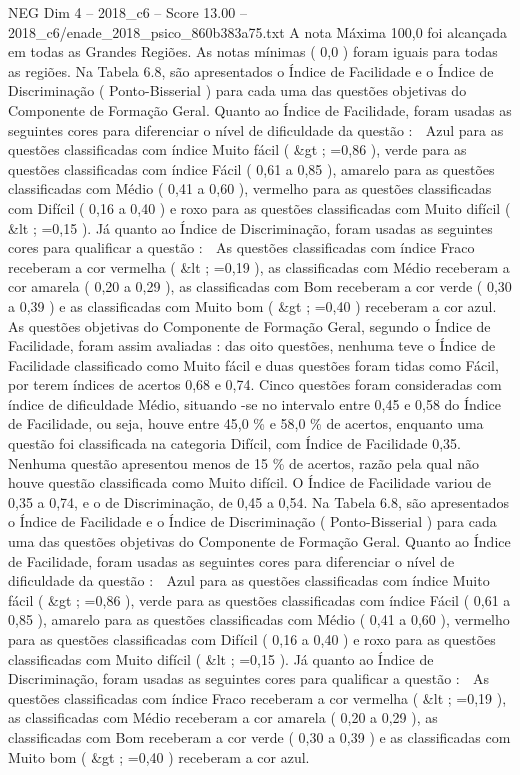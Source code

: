 \begin{textsample}{NEG Dim 4 – 2018\_c6 – Score 13.00 – 2018\_c6/enade\_2018\_psico\_860b383a75.txt}
A nota Máxima 100,0 foi alcançada em todas as Grandes Regiões.
As notas mínimas ( 0,0 ) foram iguais para todas as regiões.
Na Tabela 6.8, são apresentados o Índice de Facilidade e o Índice de Discriminação ( Ponto-Bisserial ) para cada uma das questões objetivas do Componente de Formação Geral.
Quanto ao Índice de Facilidade, foram usadas as seguintes cores para diferenciar o nível de dificuldade da questão :  Azul para as questões classificadas com índice Muito fácil ( \&gt ; =0,86 ), verde para as questões classificadas com índice Fácil ( 0,61 a 0,85 ), amarelo para as questões classificadas com Médio ( 0,41 a 0,60 ), vermelho para as questões classificadas com Difícil ( 0,16 a 0,40 ) e roxo para as questões classificadas com Muito difícil ( \&lt ; =0,15 ).
Já quanto ao Índice de Discriminação, foram usadas as seguintes cores para qualificar a questão :  As questões classificadas com índice Fraco receberam a cor vermelha ( \&lt ; =0,19 ), as classificadas com Médio receberam a cor amarela ( 0,20 a 0,29 ), as classificadas com Bom receberam a cor verde ( 0,30 a 0,39 ) e as classificadas com Muito bom ( \&gt ; =0,40 ) receberam a cor azul.
As questões objetivas do Componente de Formação Geral, segundo o Índice de Facilidade, foram assim avaliadas : das oito questões, nenhuma teve o Índice de Facilidade classificado como Muito fácil e duas questões foram tidas como Fácil, por terem índices de acertos 0,68 e 0,74.
Cinco questões foram consideradas com índice de dificuldade Médio, situando -se no intervalo entre 0,45 e 0,58 do Índice de Facilidade, ou seja, houve entre 45,0 \% e 58,0 \% de acertos, enquanto uma questão foi classificada na categoria Difícil, com Índice de Facilidade 0,35.
Nenhuma questão apresentou menos de 15 \% de acertos, razão pela qual não houve questão classificada como Muito difícil.
O Índice de Facilidade variou de 0,35 a 0,74, e o de Discriminação, de 0,45 a 0,54.
Na Tabela 6.8, são apresentados o Índice de Facilidade e o Índice de Discriminação ( Ponto-Bisserial ) para cada uma das questões objetivas do Componente de Formação Geral.
Quanto ao Índice de Facilidade, foram usadas as seguintes cores para diferenciar o nível de dificuldade da questão :  Azul para as questões classificadas com índice Muito fácil ( \&gt ; =0,86 ), verde para as questões classificadas com índice Fácil ( 0,61 a 0,85 ), amarelo para as questões classificadas com Médio ( 0,41 a 0,60 ), vermelho para as questões classificadas com Difícil ( 0,16 a 0,40 ) e roxo para as questões classificadas com Muito difícil ( \&lt ; =0,15 ).
Já quanto ao Índice de Discriminação, foram usadas as seguintes cores para qualificar a questão :  As questões classificadas com índice Fraco receberam a cor vermelha ( \&lt ; =0,19 ), as classificadas com Médio receberam a cor amarela ( 0,20 a 0,29 ), as classificadas com Bom receberam a cor verde ( 0,30 a 0,39 ) e as classificadas com Muito bom ( \&gt ; =0,40 ) receberam a cor azul.

\end{textsample}
